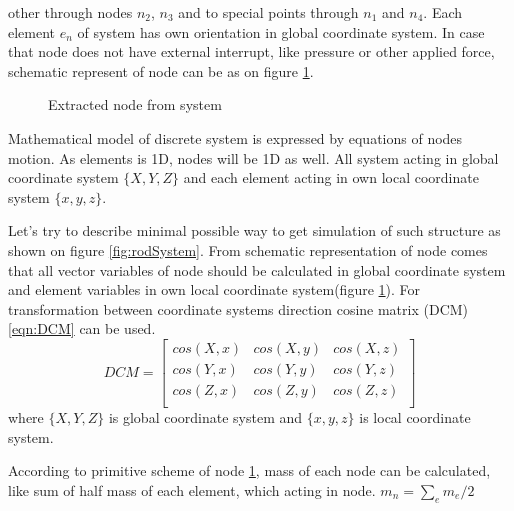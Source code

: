 other through nodes $n_2$, $n_3$ and to special points through $n_1$ and $n_4$. Each element $e_n$
of system has own orientation in global coordinate system. 
In case that node does not have external interrupt, like pressure or other applied force, schematic
 represent of node can be as on figure \ref{fig:nodeExtract}.\par
\begin{figure}[ht]
  \centering
      
  \caption{Extracted node from system}\label{fig:nodeExtract}
\end{figure}
Mathematical model of discrete system is expressed by equations of nodes motion. As elements is 1D,
nodes will be 1D as well. All system acting in global coordinate system $\{X, Y, Z\}$ and each
element acting in own local coordinate system $\{x,y,z\}$.
\par
Let's try to describe minimal possible way to get simulation of such structure as shown on figure
 \ref{fig:rodSystem}. From schematic representation of node comes that all vector variables of node
 should be calculated in global coordinate system and element variables in own local coordinate
 system(figure \ref{fig:nodeExtract}). For transformation between coordinate systems direction
 cosine matrix (DCM)\eqref{eqn:DCM} can be used.
\begin{equation}\label{eqn:DCM}
  DCM= \begin{bmatrix}
    cos(X,x)&cos(X,y)&cos(X,z)\\
    cos(Y,x)&cos(Y,y)&cos(Y,z)\\
    cos(Z,x)&cos(Z,y)&cos(Z,z)\\
   \end{bmatrix} 
\end{equation}
where $\{X, Y, Z\}$ is global coordinate system and $\{x,y,z\}$ is local coordinate
system.\par According to primitive scheme of node \ref{fig:nodeExtract}, mass of
each node can be calculated, like sum of half mass of each element, which acting
in node. $m_n=\sum_{e}m_e/2$\par
